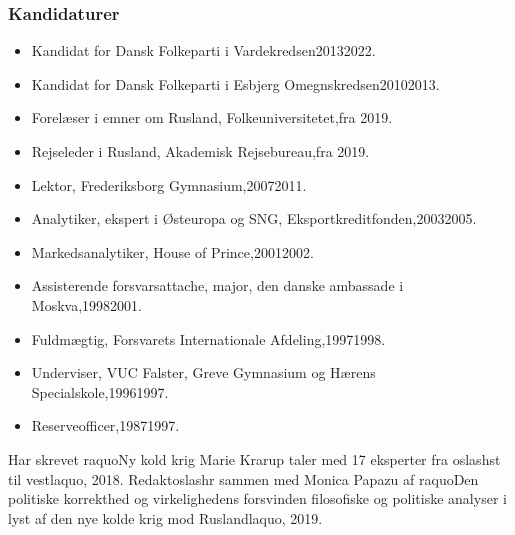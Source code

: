 \documentclass[11pt, a4paper]{awesome-cv}
\begin{document}
\begin{cvletter}
\subsubsection*{Kandidaturer}
\begin{itemize}
\item Kandidat for Dansk Folkeparti i Vardekredsen20132022.
\item Kandidat for Dansk Folkeparti i Esbjerg Omegnskredsen20102013.
\end{itemize}
\begin{itemize}
\item Forelæser i emner om Rusland, Folkeuniversitetet,fra 2019.
\item Rejseleder i Rusland, Akademisk Rejsebureau,fra 2019.
\item Lektor, Frederiksborg Gymnasium,20072011.
\item Analytiker, ekspert i Østeuropa og SNG, Eksportkreditfonden,20032005.
\item Markedsanalytiker, House of Prince,20012002.
\item Assisterende forsvarsattache, major, den danske ambassade i Moskva,19982001.
\item Fuldmægtig, Forsvarets Internationale Afdeling,19971998.
\item Underviser, VUC Falster, Greve Gymnasium og Hærens Specialskole,19961997.
\item Reserveofficer,19871997.
\end{itemize}
Har skrevet raquoNy kold krig  Marie Krarup taler med 17 eksperter fra oslashst til vestlaquo, 2018. Redaktoslashr sammen med Monica Papazu af raquoDen politiske korrekthed og virkelighedens forsvinden  filosofiske og politiske analyser i lyst af den nye kolde krig mod Ruslandlaquo, 2019.

\end{cvletter}
\end{document}
